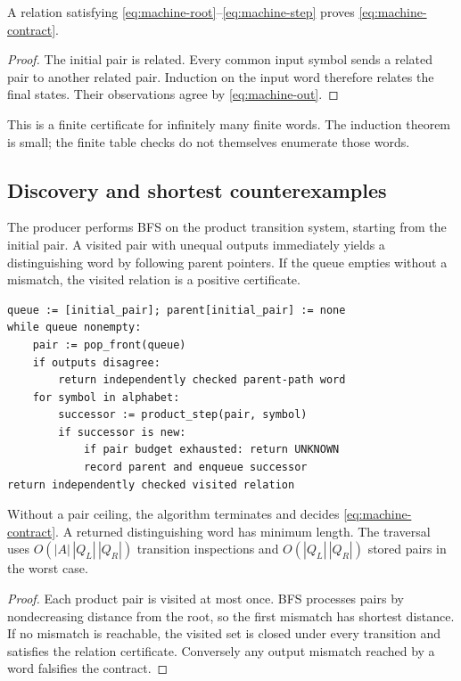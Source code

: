 \begin{theorem}
A relation satisfying \eqref{eq:machine-root}--\eqref{eq:machine-step} proves \eqref{eq:machine-contract}.
\end{theorem}
\begin{proof}
The initial pair is related. Every common input symbol sends a related pair to another related pair. Induction on the input word therefore relates the final states. Their observations agree by \eqref{eq:machine-out}.
\end{proof}

This is a finite certificate for infinitely many finite words. The induction theorem is small; the finite table checks do not themselves enumerate those words.

\subsection{Discovery and shortest counterexamples}

The producer performs BFS on the product transition system, starting from the initial pair. A visited pair with unequal outputs immediately yields a distinguishing word by following parent pointers. If the queue empties without a mismatch, the visited relation is a positive certificate.

\begin{lstlisting}
queue := [initial_pair]; parent[initial_pair] := none
while queue nonempty:
    pair := pop_front(queue)
    if outputs disagree:
        return independently checked parent-path word
    for symbol in alphabet:
        successor := product_step(pair, symbol)
        if successor is new:
            if pair budget exhausted: return UNKNOWN
            record parent and enqueue successor
return independently checked visited relation
\end{lstlisting}

\begin{proposition}
Without a pair ceiling, the algorithm terminates and decides \eqref{eq:machine-contract}. A returned distinguishing word has minimum length. The traversal uses $O(|A|\,|Q_L|\,|Q_R|)$ transition inspections and $O(|Q_L|\,|Q_R|)$ stored pairs in the worst case.
\end{proposition}
\begin{proof}
Each product pair is visited at most once. BFS processes pairs by nondecreasing distance from the root, so the first mismatch has shortest distance. If no mismatch is reachable, the visited set is closed under every transition and satisfies the relation certificate. Conversely any output mismatch reached by a word falsifies the contract.
\end{proof}

